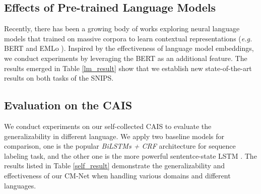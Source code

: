 \documentclass[11pt,a4paper]{article}
\begin{document}
\begin{table}[t!]
\begin{center}
\end{center}
\caption{Results on the SNIPS benchmark with the assistance of pre-trained language model, where we establish new state-of-the-art results on the SNIPS.}
\label{lm_result}
\end{table}

\subsection{Effects of Pre-trained Language Models}
\label{effects_of_lm}
Recently, there has been a growing body of works exploring neural language models that trained on massive corpora to learn contextual representations ({\em e.g.} BERT  and EMLo ).
Inspired by the effectiveness of language model embeddings, we conduct experiments by leveraging the BERT as an additional feature. The results emerged in Table \ref{lm_result} show that we establish new state-of-the-art results on both tasks of the SNIPS. 

\subsection{Evaluation on the CAIS}
We conduct experiments on our self-collected CAIS to evaluate the generalizability in different language.  We apply two baseline models for comparison, one is the popular \emph{BiLSTMs + CRF} architecture \cite{BLSTM_CRF_2015} for sequence labeling task, and the other one is the more powerful sententce-state LSTM \cite{SLSTM_2018}. The results listed in Table \ref{self_result} demonstrate the generalizability and effectiveness of our CM-Net when handling various domains and different languages.
\end{document}
